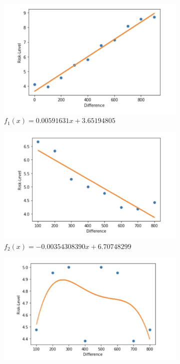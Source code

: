 \begin{figure}[ht]
\begin{subfigure}{0.5\textwidth}
    \centering
    \includegraphics[width=1\linewidth]{Bilder/risk_level_diffrence_200steps}
    \caption{$f_1(x)=0.00591631x+3.65194805$}
    \label{fig:10}
\end{subfigure}%
\begin{subfigure}{0.5\textwidth}
    \centering
    \includegraphics[width=1\linewidth]{Bilder/risk_level_diffrence_100steps}
    \caption{$f_2(x)=-0.00354308390x+6.70748299$}
    \label{fig:11}
\end{subfigure}
\begin{subfigure}{0.5\textwidth}
    \centering
    \includegraphics[width=1\linewidth]{Bilder/risk_level_diffrence_nonlinear}

\end{subfigure}
\end{figure}
